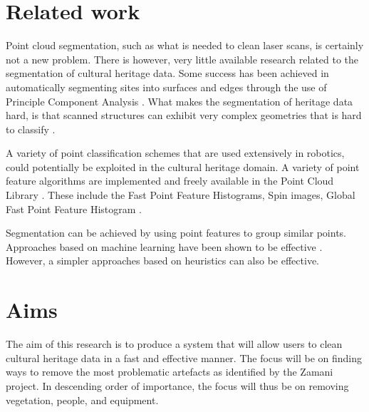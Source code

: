 \documentclass[10pt,twocolumn]{article}
\begin{document}


\section{Related work}


Point cloud segmentation, such as what is needed to clean laser scans, is certainly not a new problem. There is however, very little available research related to the segmentation of cultural heritage data. Some success has been achieved in automatically segmenting sites into surfaces and edges through the use of Principle Component Analysis \cite{Spina2010}. What makes the segmentation of heritage data hard, is that scanned structures can exhibit very complex geometries that is hard to classify \cite{Spina2010}.


A variety of point classification schemes that are used extensively in robotics, could potentially be exploited in the cultural heritage domain. A variety of point feature algorithms are implemented and freely available in the Point Cloud Library \cite{Rusu2011}. These include the Fast Point Feature Histograms, Spin images, Global Fast Point Feature Histogram \cite{Rusu2011}.

Segmentation can be achieved by using point features to group similar points. Approaches based on machine learning have been shown to be effective \cite{Shapovalov2010,Rusu2009}. However, a simpler approaches based on heuristics \cite{Spina2010} can also be effective.




\section{Aims}
The aim of this research is to produce a system that will allow users to clean cultural heritage data in a fast and effective manner. The focus will be on finding ways to remove the most problematic artefacts as identified by the Zamani project. In descending order of importance, the focus will thus be on removing vegetation, people, and equipment. 
\end{document}
